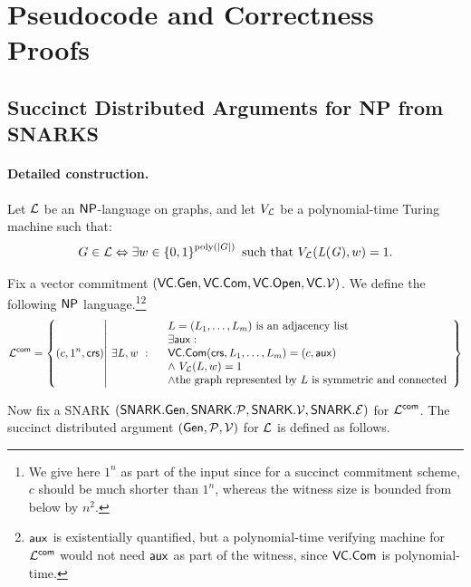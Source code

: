 \section{Pseudocode and Correctness Proofs}
\label{app:code}

\subsection{Succinct Distributed Arguments for NP from SNARKS}\label{app:dargsForNP}
\paragraph{Detailed construction.}
Let $\mathcal{L}$ be an ${\mathsf{NP}}$-language on graphs, and let $V_{\mathcal{L}}$ be a polynomial-time Turing machine such that:
\begin{gather*}
	G\in \mathcal{L} \Leftrightarrow \exists w \in \left \{{0,1} \right \}^{\operatorname{poly}(|G|)} \text{ such that } V_{\mathcal{L}}(\mathit{ L }(\mathit{ G }),w)=1.
\end{gather*}


Fix a vector commitment $(\mathsf{VC}.\mathsf{Gen}, \mathsf{VC}.\mathsf{Com}, \mathsf{VC}.\mathsf{Open}, \mathsf{VC}.\mathcal{V})$.
We define the following ${\mathsf{NP}}$ language.\footnote{We give here $1^n$ as part of the input since for a succinct commitment scheme, $c$ should be much shorter than $1^n$, whereas the witness size is bounded from below by $n^2$.}\footnote{$\mathsf{aux}$ is existentially quantified, but a polynomial-time verifying machine for $\mathcal{L}^{\mathsf{com}}$ would not need $\mathsf{aux}$ as part of the witness, since $\mathsf{VC}.\mathsf{Com}$ is polynomial-time.}
\begin{gather*}
    \mathcal{L}^{\mathsf{com}} =
    \left\{
    (c, 1^n, \mathsf{crs})
    \middle\vert
    \ \exists L, w\ :
    \begin{array}{ll}
	    & L = (L_1,\ldots,L_m) \text{ is an adjacency list}\\
         & \exists \mathsf{aux}: \\
         & \mathsf{VC}.\mathsf{Com}(\mathsf{crs}, L_1,\ldots, L_m) = (c, \mathsf{aux}) \\
         & \wedge\ V_{\mathcal{L}}(L, w) = 1 \\
	 & \wedge \text{the graph represented by $L$ is symmetric and connected}
    \end{array}
    \right\}
\end{gather*}

Now fix a SNARK  $(\mathsf{SNARK}.\mathsf{Gen}, \mathsf{SNARK}.\mathcal{P}, \mathsf{SNARK}.\mathcal{V}, \mathsf{SNARK}.\mathcal{E})$ for $\mathcal{L}^{\mathsf{com}}$.
The succinct distributed argument $(\mathsf{Gen}, \mathcal{P}, \mathcal{V})$ for $\mathcal{L}$ is defined as follows.





